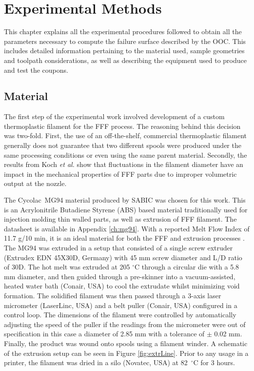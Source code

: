 \documentclass[main.tex]{subfiles}
\begin{document}
\chapter{Experimental Methods} \label{ch:exp}
This chapter explains all the experimental procedures followed to obtain all the parameters necessary to compute the failure surface described by the OOC. This includes detailed information pertaining to the material used, sample geometries and toolpath considerations, as well as describing the equipment used to produce and test the coupons.   

\section{Material} \label{sec:material}

The first step of the experimental work involved development of a custom thermoplastic filament for the FFF process. The reasoning behind this decision was two-fold. First, the use of an off-the-shelf, commercial thermoplastic filament generally does not guarantee that two different spools were produced under the same processing conditions \textemdash or even using the same parent material. Secondly, the results from Koch \emph{et al.} \cite{Koch2017} show that fluctuations in the filament diameter have an impact in the mechanical properties of FFF parts due to improper volumetric output at the nozzle.

The Cycolac\textregistered~MG94 material produced by SABIC was chosen for this work. This is an Acrylonitrile Butadiene Styrene (ABS) based material traditionally used for injection molding thin walled parts, as well as extrusion of FFF filament. The datasheet is available in Appendix \ref{ch:mg94}. With a reported Melt Flow Index of 11.7 g/10 min, it is an ideal material for both the FFF and extrusion processes \cite{sabic2016}. The MG94 was extruded in a setup that consisted of a single screw extruder (Extrudex EDN 45X30D, Germany) with 45 mm screw diameter and L/D ratio of 30D. The hot melt was extruded at 205 $^\circ$C through a circular die with a 5.8 mm diameter, and then guided through a pre-skinner into a vacuum-assisted, heated water bath (Conair, USA) to cool the extrudate whilst minimizing void formation. The solidified filament was then passed through a 3-axis laser micrometer (LaserLinc, USA) and a belt puller (Conair, USA) configured in a control loop. The dimensions of the filament were controlled by automatically adjusting the speed of the puller if the readings from the micrometer were out of specification \textemdash in this case a diameter of 2.85 mm with a tolerance of $\pm$ 0.02 mm. Finally, the product was wound onto spools using a filament winder. A schematic of the extrusion setup can be seen in Figure \ref{fig:extrLine}. Prior to any usage in a printer, the filament was dried in a silo (Novatec, USA) at 82~$^\circ$C for 3 hours.
\end{document}
